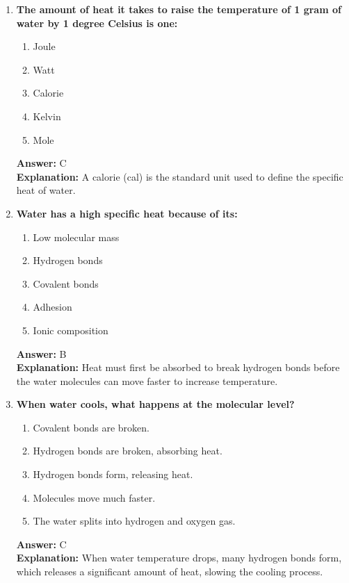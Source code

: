 \documentclass[11pt, a4paper]{article}
\begin{document}
\begin{enumerate}
\item \textbf{The amount of heat it takes to raise the temperature of 1 gram of water by 1 degree Celsius is one:}
\begin{enumerate}[label=\Alph*.]
    \item Joule
    \item Watt
    \item Calorie
    \item Kelvin
    \item Mole
\end{enumerate}
\textbf{Answer:} C \\
\textbf{Explanation:} A calorie (cal) is the standard unit used to define the specific heat of water.

\item \textbf{Water has a high specific heat because of its:}
\begin{enumerate}[label=\Alph*.]
    \item Low molecular mass
    \item Hydrogen bonds
    \item Covalent bonds
    \item Adhesion
    \item Ionic composition
\end{enumerate}
\textbf{Answer:} B \\
\textbf{Explanation:} Heat must first be absorbed to break hydrogen bonds before the water molecules can move faster to increase temperature.

\item \textbf{When water cools, what happens at the molecular level?}
\begin{enumerate}[label=\Alph*.]
    \item Covalent bonds are broken.
    \item Hydrogen bonds are broken, absorbing heat.
    \item Hydrogen bonds form, releasing heat.
    \item Molecules move much faster.
    \item The water splits into hydrogen and oxygen gas.
\end{enumerate}
\textbf{Answer:} C \\
\textbf{Explanation:} When water temperature drops, many hydrogen bonds form, which releases a significant amount of heat, slowing the cooling process.


\end{enumerate}
\end{document}
